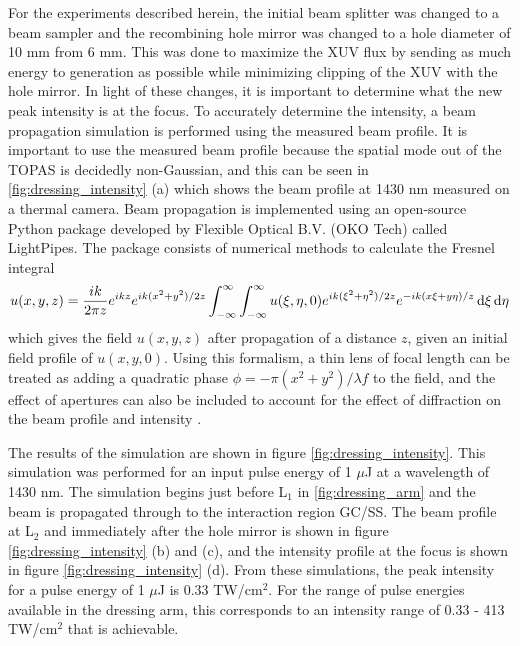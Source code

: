 For the experiments described herein, the initial beam splitter was changed to a beam sampler and the recombining hole mirror was changed to a hole diameter of 10 mm from 6 mm.  This was done to maximize the XUV flux by sending as much energy to generation as possible while minimizing clipping of the XUV with the hole mirror.  In light of these changes, it is important to determine what the new peak intensity is at the focus.  To accurately determine the intensity, a beam propagation simulation is performed using the measured beam profile.  It is important to use the measured beam profile because the spatial mode out of the TOPAS is decidedly non-Gaussian, and this can be seen in \ref{fig:dressing_intensity} (a) which shows the beam profile at 1430 nm measured on a thermal camera.  Beam propagation is implemented using an open-source Python package developed by Flexible Optical B.V. (OKO Tech) called LightPipes.  The package consists of numerical methods to calculate the Fresnel integral
\begin{equation}
\label{fresnel_integral_0}
u(x,y,z)=\frac{i k}{2\pi z}e^{i k z}e^{i k (x^2+y^2)/2z}\int_{-\infty}^{\infty}\int_{-\infty}^{\infty}u(\xi,\eta,0) e^{ik(\xi^{2}+\eta^{2})/2z} e^{-ik(x\xi + y\eta)/z} \mathop{}\!\mathrm{d}\xi\mathop{}\!\mathrm{d}\eta
\end{equation}
which gives the field $u(x,y,z)$ after propagation of a distance $z$, given an initial field profile of $u(x,y,0)$.  Using this formalism, a thin lens of focal length can be treated as adding a quadratic phase $\phi=-\pi(x^2+y^2)/\lambda f$ to the field, and the effect of apertures can also be included to account for the effect of diffraction on the beam profile and intensity \cite{goodmanIntroductionFourierOptics2005}.

The results of the simulation are shown in figure \ref{fig:dressing_intensity}.  This simulation was performed for an input pulse energy of 1 $\mu$J at a wavelength of 1430 nm. The simulation begins just before L$_1$ in \ref{fig:dressing_arm} and the beam is propagated through to the interaction region GC/SS.  The beam profile at L$_2$ and immediately after the hole mirror is shown in figure \ref{fig:dressing_intensity} (b) and (c), and the intensity profile at the focus is shown in figure \ref{fig:dressing_intensity} (d).  From these simulations, the peak intensity for a pulse energy of 1 $\mu$J is 0.33 TW/cm$^2$. For the range of pulse energies available in the dressing arm, this corresponds to an intensity range of 0.33 - 413 TW/cm$^2$ that is achievable.

